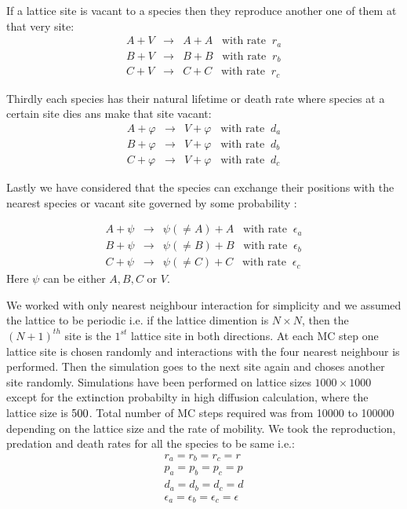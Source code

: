 \documentclass[aps, prl, twocolumn, amsmath, superscriptaddress,showkeys,showpacs]{revtex4-2}
\def\bea{\begin{eqnarray}}
\def\eea{\end{eqnarray}}
\begin{document}
If a lattice site is vacant to a species then they reproduce another one of them at that very site:
\bea
A + V & \longrightarrow & A + A \;\;\; \mbox{with rate}\;\; r_a\nonumber \\
B + V & \longrightarrow & B + B \;\;\; \mbox{with rate}\;\; r_b\nonumber \\
C + V & \longrightarrow & C + C \;\;\; \mbox{with rate}\;\; r_c
\label{reproduction}
\eea

Thirdly each species has their natural lifetime or death rate where species at a certain site dies ans make that site vacant:
\bea
A + \varphi & \longrightarrow & V + \varphi \;\;\; \mbox{with rate}\;\; d_a \nonumber \\
B + \varphi & \longrightarrow & V + \varphi \;\;\; \mbox{with rate}\;\; d_b\nonumber \\
C + \varphi & \longrightarrow & V + \varphi \;\;\; \mbox{with rate}\;\; d_c
\label{death}
\eea	       

Lastly we have considered that the species can exchange their positions with the nearest species or vacant site governed by some probability :

\bea
A + \psi & \longrightarrow & \psi(\neq A) + A \;\;\; \mbox{with rate}\;\; \epsilon_a \nonumber \\
B + \psi & \longrightarrow & \psi(\neq B) + B \;\;\; \mbox{with rate}\;\; \epsilon_b\nonumber \\
C + \psi & \longrightarrow & \psi(\neq C) + C \;\;\; \mbox{with rate}\;\; \epsilon_c
\label{hop}
\eea
Here $\psi$ can be either $A,B,C$ or $V$.     

We worked with only nearest neighbour interaction for simplicity and we assumed the lattice to be periodic i.e. if the lattice dimention is $N \times N$, then the $(N+1)^{th}$ site is the $1^{st}$ lattice site in both directions. At each MC step one lattice site is chosen randomly and interactions with the four nearest neighbour is performed. Then the simulation goes to the next site again and choses another site randomly. Simulations have been performed on lattice sizes $1000 \times 1000$ except for the extinction probabilty in high diffusion calculation, where the lattice size is $500\time500$. Total number of MC steps required was from 10000 to 100000 depending on the lattice size and the rate of mobility. We took the reproduction, predation and death rates for all the species to be same i.e.:
\bea
r_a=r_b=r_c=r \nonumber\\
p_a=p_b=p_c=p \nonumber\\
d_a=d_b=d_c=d \nonumber\\
\epsilon_a=\epsilon_b=\epsilon_c=\epsilon
\eea
\end{document}
